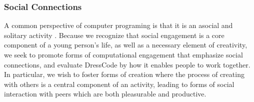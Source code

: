 \documentclass{sigchi}
\begin{document}
\subsubsection{Social Connections}
A common perspective of computer programing is that it is an asocial and solitary activity \cite{introductory_programming}. Because we recognize that social engagement is a core component of a young person's life, as well as a necessary element of creativity, we seek to promote forms of computational engagement that emphasize social connections, and evaluate DressCode by how it enables people to work together. In particular, we wish to foster forms of creation where the process of creating with others is a central component of an activity, leading to forms of social interaction with peers which are both pleasurable and productive. 
\end{document}
